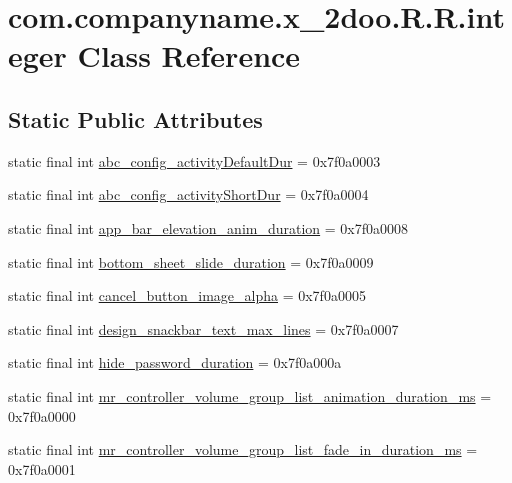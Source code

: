 \hypertarget{classcom_1_1companyname_1_1x__2doo_1_1_r_1_1integer}{
\section{com.companyname.x\_\-2doo.R.R.integer Class Reference}
\label{classcom_1_1companyname_1_1x__2doo_1_1_r_1_1integer}
}
\subsection*{Static Public Attributes}
\begin{CompactItemize}
\item 
static final int \hyperlink{classcom_1_1companyname_1_1x__2doo_1_1_r_1_1integer_f2dde2c22e157f961db3e64e748e4207}{abc\_\-config\_\-activityDefaultDur} = 0x7f0a0003
\item 
static final int \hyperlink{classcom_1_1companyname_1_1x__2doo_1_1_r_1_1integer_39a52000b6f5206239d07b9787e202f1}{abc\_\-config\_\-activityShortDur} = 0x7f0a0004
\item 
static final int \hyperlink{classcom_1_1companyname_1_1x__2doo_1_1_r_1_1integer_6763b9da7c2b7a2c7cc649ed93b1ae85}{app\_\-bar\_\-elevation\_\-anim\_\-duration} = 0x7f0a0008
\item 
static final int \hyperlink{classcom_1_1companyname_1_1x__2doo_1_1_r_1_1integer_f24d5ece2e27c39096aaf0ec15e5a501}{bottom\_\-sheet\_\-slide\_\-duration} = 0x7f0a0009
\item 
static final int \hyperlink{classcom_1_1companyname_1_1x__2doo_1_1_r_1_1integer_b722e2ae2bc090b66be4720009c23c0e}{cancel\_\-button\_\-image\_\-alpha} = 0x7f0a0005
\item 
static final int \hyperlink{classcom_1_1companyname_1_1x__2doo_1_1_r_1_1integer_5caaa1c0369d48ebc7e1d240fbb7026a}{design\_\-snackbar\_\-text\_\-max\_\-lines} = 0x7f0a0007
\item 
static final int \hyperlink{classcom_1_1companyname_1_1x__2doo_1_1_r_1_1integer_ef7628a3cbaf62031138956e0d8dbd84}{hide\_\-password\_\-duration} = 0x7f0a000a
\item 
static final int \hyperlink{classcom_1_1companyname_1_1x__2doo_1_1_r_1_1integer_18253f598f891fadc49931d6072697e3}{mr\_\-controller\_\-volume\_\-group\_\-list\_\-animation\_\-duration\_\-ms} = 0x7f0a0000
\item 
static final int \hyperlink{classcom_1_1companyname_1_1x__2doo_1_1_r_1_1integer_b1bb94e3a07f08d4ecb166cc042b3c46}{mr\_\-controller\_\-volume\_\-group\_\-list\_\-fade\_\-in\_\-duration\_\-ms} = 0x7f0a0001

\end{CompactItemize}
